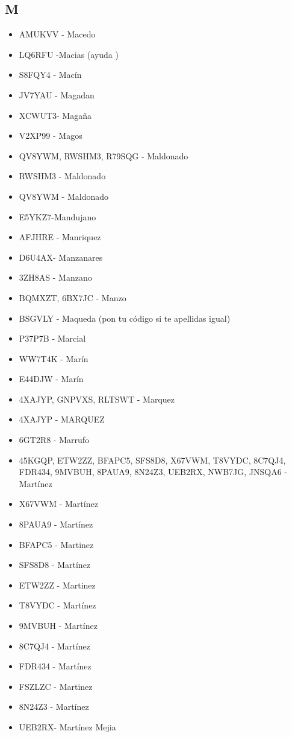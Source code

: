 \subsection*{M}
\begin{itemize}[leftmargin=*,nosep]
\item AMUKVV - Macedo
\item LQ6RFU -Macias (ayuda )
\item S8FQY4 - Macín
\item JV7YAU - Magadan
\item XCWUT3- Magaña
\item V2XP99 - Magos
\item QV8YWM, RWSHM3, R79SQG - Maldonado
\item RWSHM3 - Maldonado
\item QV8YWM  -  Maldonado
\item E5YKZ7-Mandujano
\item AFJHRE  -  Manriquez
\item D6U4AX- Manzanares
\item 3ZH8AS - Manzano
\item BQMXZT, 6BX7JC  -  Manzo
\item BSGVLY - Maqueda (pon tu código si te apellidas igual)
\item P37P7B - Marcial
\item WW7T4K  -  Marín
\item E44DJW  -  Marín
\item 4XAJYP, GNPVXS, RLTSWT - Marquez
\item 4XAJYP - MARQUEZ
\item 6GT2R8 - Marrufo
\item 45KGQP, ETW2ZZ, BFAPC5, SFS8D8, X67VWM, T8VYDC, 8C7QJ4, FDR434, 9MVBUH, 8PAUA9, 8N24Z3, UEB2RX, NWB7JG, JNSQA6 - Martínez
\item X67VWM  -  Martínez
\item 8PAUA9 - Martínez
\item BFAPC5  -  Martinez
\item SFS8D8  -  Martínez
\item ETW2ZZ  -  Martinez
\item T8VYDC - Martínez
\item 9MVBUH  -  Martínez
\item 8C7QJ4  -  Martínez
\item FDR434 -  Martínez
\item FSZLZC  -  Martinez
\item 8N24Z3  - Martínez
\item UEB2RX- Martínez Mejia

\end{itemize}
